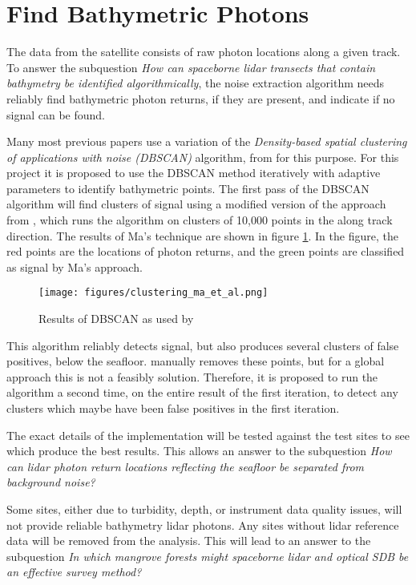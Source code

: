 \section{Find Bathymetric Photons}

The data from the satellite consists of raw photon locations along a given track. To answer the subquestion \emph{How can spaceborne lidar transects that contain bathymetry be identified algorithmically}, the noise extraction algorithm needs reliably find bathymetric photon returns, if they are present, and indicate if no signal can be found.

Many most previous papers use a variation of the \emph{Density-based spatial clustering of applications with noise (DBSCAN)} algorithm, from \citeauthor{Ester1996} for this purpose. For this project it is proposed to use the DBSCAN method iteratively with adaptive parameters to identify bathymetric points. The first pass of the DBSCAN algorithm will find clusters of signal using a modified version of the approach from \citeauthor{Ma2020}, which runs the algorithm on clusters of 10,000 points in the along track direction. The results of Ma's technique are shown in figure \ref{fig:dbscan-clustering}. In the figure, the red points are the locations of photon returns, and the green points are classified as signal by Ma's approach.

\begin{figure}[htbp]
      \centering
      \texttt{[image: figures/clustering\_ma\_et\_al.png]}
      \caption{Results of DBSCAN as used by \citeauthor{Ma2020}}
      \label{fig:dbscan-clustering}
\end{figure}

This algorithm reliably detects signal, but also produces several clusters of false positives, below the seafloor. \citeauthor{Ma2020} manually removes these points, but for a global approach this is not a feasibly solution. Therefore, it is proposed to run the algorithm a second time, on the entire result of the first iteration, to detect any clusters which maybe have been false positives in the first iteration.

The exact details of the implementation will be tested against the test sites to see which produce the best results. This allows an answer to the subquestion \emph{How can lidar photon return locations reflecting the seafloor be separated from background noise?}

Some sites, either due to turbidity, depth, or instrument data quality issues, will not provide reliable bathymetry lidar photons. Any sites without lidar reference data will be removed from the analysis. This will lead to an answer to the subquestion \emph{In which mangrove forests might spaceborne lidar and optical SDB be an effective survey method?}

